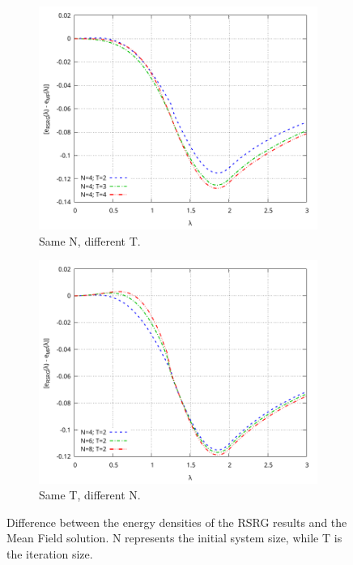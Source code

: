 \documentclass[11pt,a4paper]{article}
\begin{document}
\begin{figure}
	\centering
	\begin{subfigure}{0.49\textwidth}
		\includegraphics[width=1\linewidth]{Plots/GS_diff_N4.pdf}
		\caption{Same N, different T.}
		\label{fig:gsdiffN4}
	\end{subfigure}%
	\hfill
	\begin{subfigure}{0.49\textwidth}
		\includegraphics[width=1\linewidth]{Plots/GS_diff_T2.pdf}
		\caption{Same T, different N.}
		\label{fig:gsdiffT2}
	\end{subfigure}
	\caption{Difference between the energy densities of the RSRG results and the Mean Field solution. N represents the initial system size, while T is the iteration size.}
	\label{fig:gsdiff}
\end{figure}
\end{document}
